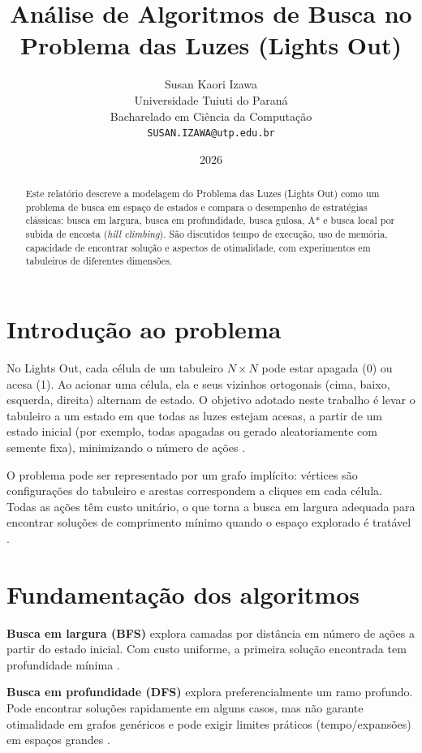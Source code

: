 \documentclass[12pt,a4paper]{article}
\title{An\'alise de Algoritmos de Busca no Problema das Luzes (Lights Out)}
\author{
    Susan Kaori Izawa\\
    Universidade Tuiuti do Paran\'a\\
    Bacharelado em Ci\^encia da Computa\c{c}\~ao\\
    \texttt{SUSAN.IZAWA@utp.edu.br}
}
\date{2026}
\begin{document}
\maketitle

\begin{abstract}
Este relat\'orio descreve a modelagem do Problema das Luzes (Lights Out) como um problema de busca em espa\c{c}o de estados e compara o desempenho de estrat\'egias cl\'assicas: busca em largura, busca em profundidade, busca gulosa, A* e busca local por subida de encosta (\textit{hill climbing}). S\~ao discutidos tempo de execu\c{c}\~ao, uso de mem\'oria, capacidade de encontrar solu\c{c}\~ao e aspectos de otimalidade, com experimentos em tabuleiros de diferentes dimens\~oes.
\end{abstract}

\section{Introdu\c{c}\~ao ao problema}

No Lights Out, cada c\'elula de um tabuleiro $N\times N$ pode estar apagada (0) ou acesa (1). Ao acionar uma c\'elula, ela e seus vizinhos ortogonais (cima, baixo, esquerda, direita) alternam de estado. O objetivo adotado neste trabalho \'e levar o tabuleiro a um estado em que todas as luzes estejam acesas, a partir de um estado inicial (por exemplo, todas apagadas ou gerado aleatoriamente com semente fixa), minimizando o n\'umero de a\c{c}\~oes \citep{russell2021}.

O problema pode ser representado por um grafo impl\'icito: v\'ertices s\~ao configura\c{c}\~oes do tabuleiro e arestas correspondem a cliques em cada c\'elula. Todas as a\c{c}\~oes t\^em custo unit\'ario, o que torna a busca em largura adequada para encontrar solu\c{c}\~oes de comprimento m\'inimo quando o espa\c{c}o explorado \'e trat\'avel \citep{russell2021}.

\section{Fundamenta\c{c}\~ao dos algoritmos}

\textbf{Busca em largura (BFS)} explora camadas por dist\^ancia em n\'umero de a\c{c}\~oes a partir do estado inicial. Com custo uniforme, a primeira solu\c{c}\~ao encontrada tem profundidade m\'inima \citep{russell2021}.

\textbf{Busca em profundidade (DFS)} explora preferencialmente um ramo profundo. Pode encontrar solu\c{c}\~oes rapidamente em alguns casos, mas n\~ao garante otimalidade em grafos gen\'ericos e pode exigir limites pr\'aticos (tempo/expans\~oes) em espa\c{c}os grandes \citep{russell2021}.
\end{document}
